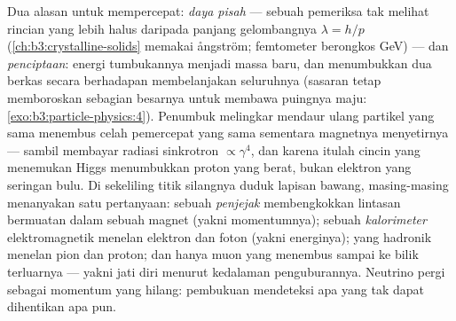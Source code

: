 \begin{remark}\label{rem:b3:particle-physics:machines}
Dua alasan untuk mempercepat: \emph{daya pisah} --- sebuah pemeriksa tak melihat
rincian yang lebih halus daripada panjang gelombangnya $\lambda = h/p$
(\cref{ch:b3:crystalline-solids} memakai ångström; femtometer
berongkos \unit{GeV}) --- dan \emph{penciptaan}: energi tumbukannya
menjadi massa baru, dan menumbukkan dua berkas secara berhadapan
membelanjakan seluruhnya (sasaran tetap memboroskan sebagian besarnya untuk
membawa puingnya maju: \cref{exo:b3:particle-physics:4}). Penumbuk
melingkar mendaur ulang partikel yang sama menembus celah pemercepat yang sama
sementara magnetnya menyetirnya --- sambil membayar radiasi sinkrotron
$\propto\gamma^4$, dan karena itulah cincin yang menemukan Higgs
menumbukkan proton yang berat, bukan elektron yang seringan bulu. Di sekeliling
titik silangnya duduk lapisan bawang, masing-masing menanyakan satu pertanyaan: sebuah
\emph{penjejak} membengkokkan lintasan bermuatan dalam sebuah magnet (yakni momentumnya); sebuah
\emph{kalorimeter} elektromagnetik menelan elektron dan
foton (yakni energinya); yang hadronik menelan pion dan proton;
dan hanya muon yang menembus sampai ke bilik terluarnya ---
yakni jati diri menurut kedalaman penguburannya. Neutrino pergi sebagai momentum
yang hilang: pembukuan mendeteksi apa yang tak dapat dihentikan apa pun.
\end{remark}

